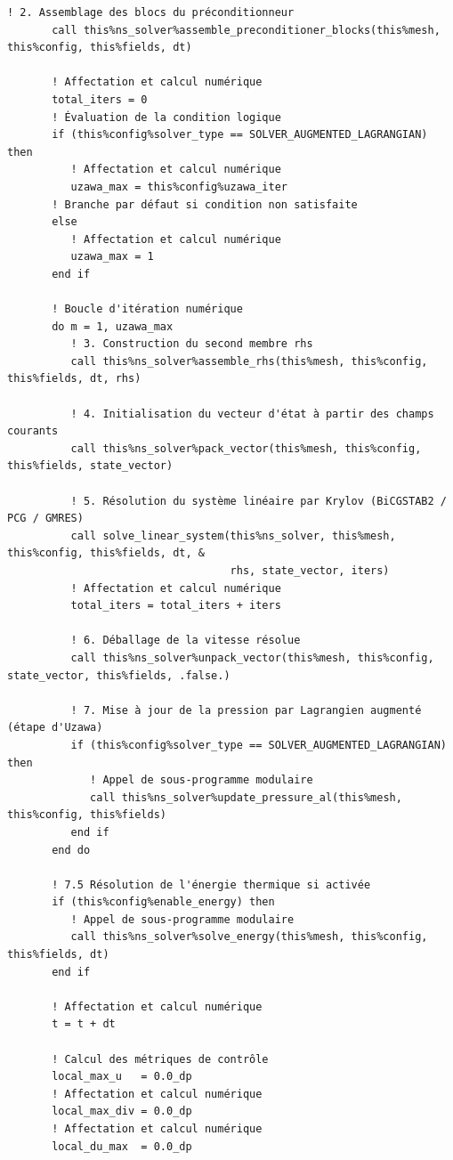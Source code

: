 \documentclass[10pt,a4paper,oneside]{book}
\begin{document}
\begin{lstlisting}[language={[95]Fortran}]
       ! 2. Assemblage des blocs du préconditionneur
       call this%ns_solver%assemble_preconditioner_blocks(this%mesh, this%config, this%fields, dt)

       ! Affectation et calcul numérique
       total_iters = 0
       ! Évaluation de la condition logique
       if (this%config%solver_type == SOLVER_AUGMENTED_LAGRANGIAN) then
          ! Affectation et calcul numérique
          uzawa_max = this%config%uzawa_iter
       ! Branche par défaut si condition non satisfaite
       else
          ! Affectation et calcul numérique
          uzawa_max = 1
       end if

       ! Boucle d'itération numérique
       do m = 1, uzawa_max
          ! 3. Construction du second membre rhs
          call this%ns_solver%assemble_rhs(this%mesh, this%config, this%fields, dt, rhs)

          ! 4. Initialisation du vecteur d'état à partir des champs courants
          call this%ns_solver%pack_vector(this%mesh, this%config, this%fields, state_vector)

          ! 5. Résolution du système linéaire par Krylov (BiCGSTAB2 / PCG / GMRES)
          call solve_linear_system(this%ns_solver, this%mesh, this%config, this%fields, dt, &
                                   rhs, state_vector, iters)
          ! Affectation et calcul numérique
          total_iters = total_iters + iters

          ! 6. Déballage de la vitesse résolue
          call this%ns_solver%unpack_vector(this%mesh, this%config, state_vector, this%fields, .false.)

          ! 7. Mise à jour de la pression par Lagrangien augmenté (étape d'Uzawa)
          if (this%config%solver_type == SOLVER_AUGMENTED_LAGRANGIAN) then
             ! Appel de sous-programme modulaire
             call this%ns_solver%update_pressure_al(this%mesh, this%config, this%fields)
          end if
       end do

       ! 7.5 Résolution de l'énergie thermique si activée
       if (this%config%enable_energy) then
          ! Appel de sous-programme modulaire
          call this%ns_solver%solve_energy(this%mesh, this%config, this%fields, dt)
       end if

       ! Affectation et calcul numérique
       t = t + dt

       ! Calcul des métriques de contrôle
       local_max_u   = 0.0_dp
       ! Affectation et calcul numérique
       local_max_div = 0.0_dp
       ! Affectation et calcul numérique
       local_du_max  = 0.0_dp


\end{lstlisting}
\end{document}
